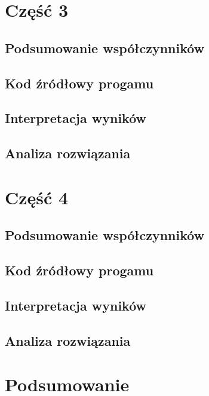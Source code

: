 \documentclass[
	12pt, %
]{fphw}
\begin{document}
\section{Część 3}
\subsection{Podsumowanie współczynników}
\subsection{Kod źródłowy progamu}
\subsection{Interpretacja wyników}
\subsection{Analiza rozwiązania}
\section{Część 4}
\subsection{Podsumowanie współczynników}
\subsection{Kod źródłowy progamu}
\subsection{Interpretacja wyników}
\subsection{Analiza rozwiązania}
\section{Podsumowanie}
\end{document}
